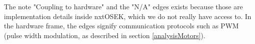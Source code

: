 The note "Coupling to hardware" and the "N/A" edges exists because those are implementation details inside nxtOSEK, which we do not really have access to. In the hardware frame, the edges signify communication protocols such as PWM (pulse width modulation, as described in section \ref{analysisMotors}). 

